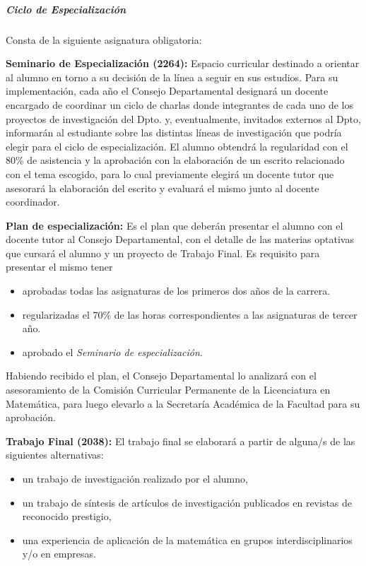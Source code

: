 \documentclass[a4paper, 12pt]{article}
\begin{document}
\subparagraph{Ciclo de Especialización} Consta de la siguiente
asignatura obligatoria:



\textbf{Seminario de Especialización (2264):} Espacio curricular
destinado a orientar al alumno en torno a su decisión de la línea
a seguir en sus estudios. Para su implementación, cada año el
Consejo Departamental designará un docente encargado de coordinar
 un ciclo de charlas donde  integrantes de cada uno
de los proyectos de investigación del Dpto. y, eventualmente,
invitados externos al Dpto, informarán al estudiante sobre las
distintas líneas de investigación que podría elegir para el ciclo
de especialización. El alumno obtendrá la regularidad con el 80\%
de asistencia y la aprobación con la elaboración de un escrito
relacionado con el tema escogido, para lo cual previamente elegirá
un docente tutor que asesorará la elaboración del escrito y
evaluará el mismo junto al docente coordinador.



\textbf{Plan de especialización:} Es el plan que deberán presentar el alumno con el  docente tutor al Consejo Departamental, con el detalle de las materias optativas que cursará el alumno y un proyecto de Trabajo Final. Es requisito para presentar el mismo tener

\begin{itemize}
\item aprobadas todas las asignaturas de los primeros dos años de la carrera.
\item regularizadas el 70\% de las horas correspondientes a las asignaturas de tercer año.
\item aprobado el \emph{Seminario de especialización}.
\end{itemize}
Habiendo recibido el plan, el Consejo Departamental lo analizará con el asesoramiento de la Comisión Curricular Permanente de la Licenciatura en Matemática, para luego elevarlo a la Secretaría Académica de la Facultad para su aprobación.

\textbf{Trabajo Final (2038):} El trabajo
final se elaborará a partir de alguna/s de las siguientes
alternativas:
\begin{itemize}
\item un trabajo de investigación realizado por el alumno,
\item un trabajo de síntesis de artículos de investigación publicados en
revistas de reconocido prestigio,
\item una experiencia de aplicación de la matemática en grupos interdisciplinarios
y/o en empresas.
\end{itemize}
\end{document}
